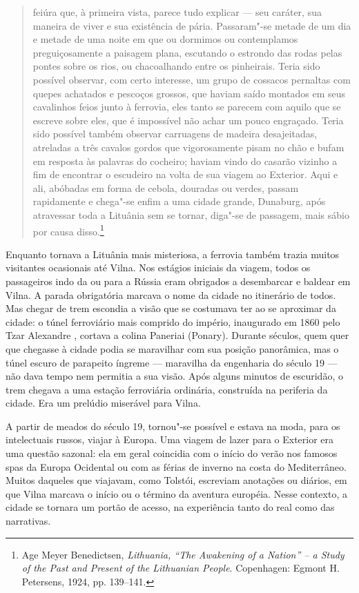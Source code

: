 \begin{quote}
feiúra que, à primeira vista, parece tudo explicar --- seu caráter, sua
maneira de viver e sua existência de pária. Passaram"-se metade de um dia
e metade de uma noite em que ou dormimos ou contemplamos preguiçosamente
a paisagem plana, escutando o estrondo das rodas pelas pontes sobre os
rios, ou chacoalhando entre os pinheirais. Teria sido possível observar,
com certo interesse, um grupo de cossacos pernaltas com quepes achatados
e pescoços grossos, que haviam saído montados em seus cavalinhos feios
junto à ferrovia, eles tanto se parecem com aquilo que se escreve sobre
eles, que é impossível não achar um pouco engraçado. Teria sido possível
também observar carruagens de madeira desajeitadas, atreladas a três
cavalos gordos que vigorosamente pisam no chão e bufam em resposta às
palavras do cocheiro; haviam vindo do casarão vizinho a fim de encontrar
o escudeiro na volta de sua viagem ao Exterior. Aqui e ali, abóbadas em
forma de cebola, douradas ou verdes, passam rapidamente e chega"-se enfim
a uma cidade grande, Dunaburg, após atravessar toda a Lituânia sem se
tornar, diga"-se de passagem, mais sábio por causa disso.\footnote{Age
  Meyer Benedictsen, \emph{Lithuania, ``The Awakening of a Nation'' -- a
  Study of the Past and Present of the Lithuanian People}. Copenhagen:
  Egmont H. Petersens, 1924, pp. 139--141.}
\end{quote}

Enquanto tornava a Lituânia mais misteriosa, a ferrovia também trazia
muitos visitantes ocasionais até Vilna. Nos estágios iniciais da viagem,
todos os passageiros indo da ou para a Rússia eram obrigados a
desembarcar e baldear em Vilna. A parada obrigatória marcava o nome da
cidade no itinerário de todos. Mas chegar de trem escondia a visão que
se costumava ter ao se aproximar da cidade: o túnel ferroviário mais
comprido do império, inaugurado em 1860 pelo Tzar Alexandre , cortava
a colina Paneriai (Ponary). Durante séculos, quem quer que chegasse à
cidade podia se maravilhar com sua posição panorâmica, mas o túnel
escuro de parapeito íngreme --- maravilha da engenharia do século 19 --- não
dava tempo nem permitia a sua visão. Após alguns minutos de escuridão, o
trem chegava a uma estação ferroviária ordinária, construída na
periferia da cidade. Era um prelúdio miserável para Vilna.

A partir de meados do século 19, tornou"-se possível e estava na moda,
para os intelectuais russos, viajar à Europa. Uma viagem de lazer para o
Exterior era uma questão sazonal: ela em geral coincidia com o início do
verão nos famosos spas da Europa Ocidental ou com as férias de inverno
na costa do Mediterrâneo. Muitos daqueles que viajavam, como Tolstói,
escreviam anotações ou diários, em que Vilna marcava o início ou o
término da aventura européia. Nesse contexto, a cidade se tornara um
portão de acesso, na experiência tanto do real como das narrativas.


